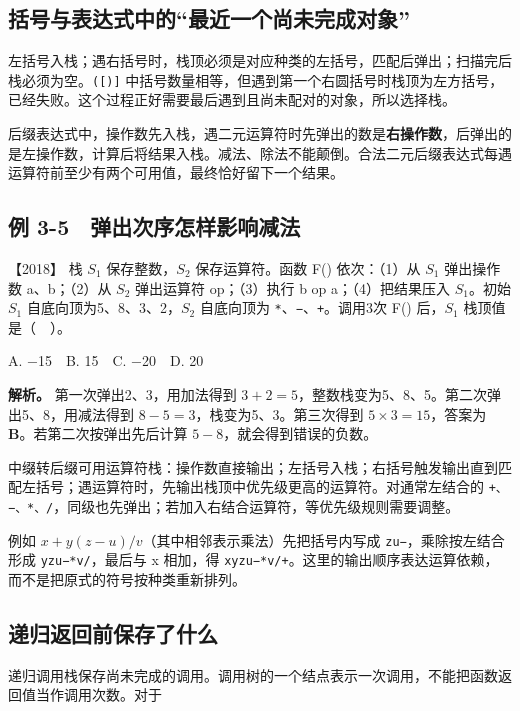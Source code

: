 \subsection{括号与表达式中的``最近一个尚未完成对象''}\label{ds-c03-h132}

左括号入栈；遇右括号时，栈顶必须是对应种类的左括号，匹配后弹出；扫描完后栈必须为空。\texttt{({[}){]}} 中括号数量相等，但遇到第一个右圆括号时栈顶为左方括号，已经失败。这个过程正好需要最后遇到且尚未配对的对象，所以选择栈。

后缀表达式中，操作数先入栈，遇二元运算符时先弹出的数是\textbf{右操作数}，后弹出的是左操作数，计算后将结果入栈。减法、除法不能颠倒。合法二元后缀表达式每遇运算符前至少有两个可用值，最终恰好留下一个结果。

\subsection{例 3-5　弹出次序怎样影响减法}\label{ds-ex3-5}

\noindent{}【2018】 栈 \(S_1\) 保存整数，\(S_2\) 保存运算符。函数 F() 依次：（1）从 \(S_1\) 弹出操作数 a、b；（2）从 \(S_2\) 弹出运算符 op；（3）执行 b op a；（4）把结果压入 \(S_1\)。初始 \(S_1\) 自底向顶为5、8、3、2，\(S_2\) 自底向顶为 \texttt{*}、\texttt{−}、\texttt{+}。调用3次 F() 后，\(S_1\) 栈顶值是（　）。

A. −15　B. 15　C. −20　D. 20


\textbf{解析。} 第一次弹出2、3，用加法得到 \(3+2=5\)，整数栈变为5、8、5。第二次弹出5、8，用减法得到 \(8-5=3\)，栈变为5、3。第三次得到 \(5\times3=15\)，答案为 \textbf{B}。若第二次按弹出先后计算 \(5-8\)，就会得到错误的负数。

中缀转后缀可用运算符栈：操作数直接输出；左括号入栈；右括号触发输出直到匹配左括号；遇运算符时，先输出栈顶中优先级更高的运算符。对通常左结合的 \texttt{+、−、*、/}，同级也先弹出；若加入右结合运算符，等优先级规则需要调整。

例如 \(x+y(z-u)/v\)（其中相邻表示乘法）先把括号内写成 \texttt{zu−}，乘除按左结合形成 \texttt{yzu−*v/}，最后与 x 相加，得 \texttt{xyzu−*v/+}。这里的输出顺序表达运算依赖，而不是把原式的符号按种类重新排列。

\subsection{递归返回前保存了什么}\label{ds-c03-h150}

递归调用栈保存尚未完成的调用。调用树的一个结点表示一次调用，不能把函数返回值当作调用次数。对于


